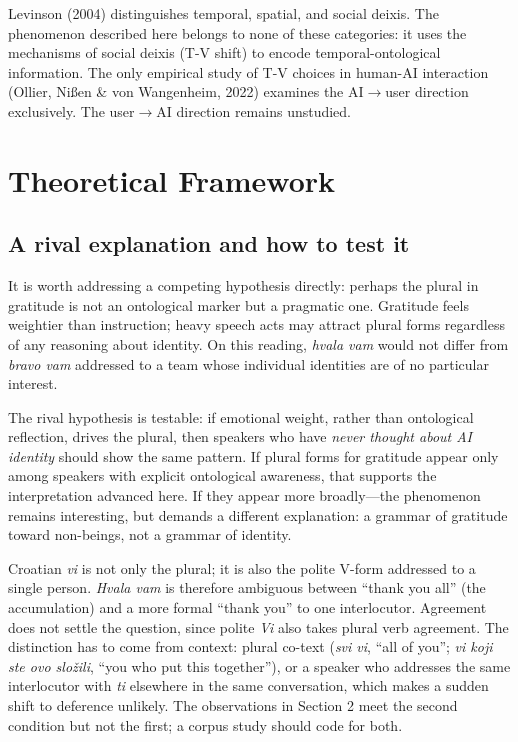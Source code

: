 \documentclass[12pt,a4paper]{article}
\begin{document}
Levinson (2004) distinguishes temporal, spatial, and social deixis. The phenomenon described here belongs to none of these categories: it uses the mechanisms of social deixis (T-V shift) to encode temporal-ontological information. The only empirical study of T-V choices in human-AI interaction (Ollier, Nißen \& von Wangenheim, 2022) examines the AI$\rightarrow$user direction exclusively. The user$\rightarrow$AI direction remains unstudied.

\section{Theoretical Framework}

\subsection*{A rival explanation and how to test it}

It is worth addressing a competing hypothesis directly: perhaps the plural in gratitude is not an ontological marker but a pragmatic one. Gratitude feels weightier than instruction; heavy speech acts may attract plural forms regardless of any reasoning about identity. On this reading, \textit{hvala vam} would not differ from \textit{bravo vam} addressed to a team whose individual identities are of no particular interest.

The rival hypothesis is testable: if emotional weight, rather than ontological reflection, drives the plural, then speakers who have \textit{never thought about AI identity} should show the same pattern. If plural forms for gratitude appear only among speakers with explicit ontological awareness, that supports the interpretation advanced here. If they appear more broadly---the phenomenon remains interesting, but demands a different explanation: a grammar of gratitude toward non-beings, not a grammar of identity.

Croatian \textit{vi} is not only the plural; it is also the polite V-form addressed to a single person. \textit{Hvala vam} is therefore ambiguous between ``thank you all'' (the accumulation) and a more formal ``thank you'' to one interlocutor. Agreement does not settle the question, since polite \textit{Vi} also takes plural verb agreement. The distinction has to come from context: plural co-text (\textit{svi vi}, ``all of you''; \textit{vi koji ste ovo složili}, ``you who put this together''), or a speaker who addresses the same interlocutor with \textit{ti} elsewhere in the same conversation, which makes a sudden shift to deference unlikely. The observations in Section 2 meet the second condition but not the first; a corpus study should code for both.
\end{document}
